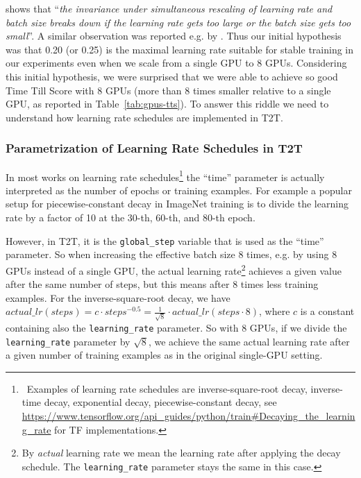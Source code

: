 \documentclass{pbmlarxiv} \pdfoutput=1
\def\Tref#1{Table~\ref{#1}}
\begin{document}
\citet{jastrzebski-et-al:2017} shows that
 ``\emph{the invariance under simultaneous rescaling of learning rate and batch size
  breaks down if the learning rate gets too large or the batch size gets too small}''.
A similar observation was reported e.g. by \citet{bottou-et-al:2016}.
Thus our initial hypothesis was that 0.20 (or 0.25) is the maximal learning rate
 suitable for stable training in our experiments
 even when we scale from a single GPU to 8 GPUs.
Considering this initial hypothesis,
 we were surprised that we were able to achieve so good Time Till Score with 8 GPUs
 (more than 8 times smaller relative to a single GPU, as reported in \Tref{tab:gpus-tts}).
To answer this riddle we need to understand how learning rate schedules are implemented in T2T.

\subsubsection{Parametrization of Learning Rate Schedules in T2T}\label{sec:lr-schedule}
In most works on learning rate schedules\cprotect\footnote{~Examples of learning rate schedules are
 inverse-square-root decay, inverse-time decay, exponential decay, piecewise-constant decay,
 see \url{https://www.tensorflow.org/api_guides/python/train#Decaying_the_learning_rate}
 for TF implementations.
}
 the ``time'' parameter is actually interpreted as the number of epochs or training examples.
For example a popular setup for piecewise-constant decay in ImageNet training \citep[e.g.][]{goyal-et-al:2017}
 is to divide the learning rate by a factor of 10 at the 30-th, 60-th, and 80-th epoch.

However, in T2T, it is the \verb|global_step| variable that is used as the ``time'' parameter.
So when increasing the effective batch size 8 times, e.g. by using 8 GPUs instead of a single GPU,
 the actual learning rate\footnote{
  By \emph{actual} learning rate
   we mean the learning rate after applying the decay schedule.
   The \texttt{learning\_rate} parameter stays the same in this case.
 } achieves a given value after the same number of steps,
 but this means after 8 times less training examples.
For the inverse-square-root decay, we have
 $\textit{actual\_lr}(\textit{steps}) =
  c \cdot \textit{steps}^{-0.5} =
  \frac{1}{\sqrt{8}} \cdot \textit{actual\_lr}(\textit{steps} \cdot 8)$,
 where $c$ is a constant containing also the \verb|learning_rate| parameter.
So with 8 GPUs, if we divide the \verb|learning_rate| parameter by $\sqrt{8}$,
 we achieve the same actual learning rate after a given number of training examples
 as in the original single-GPU setting.
\end{document}
